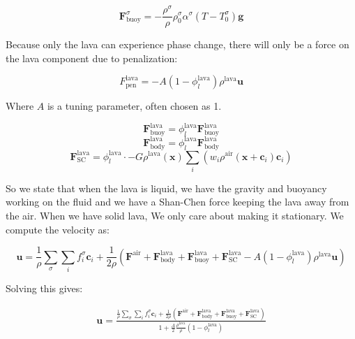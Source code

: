 \begin{equation}
    \bm{F}_{\text{buoy}}^\sigma = -\frac{\rho^\sigma}{\rho}\rho^\sigma_0\alpha^\sigma\left(T - T_0^\sigma\right)\bm{g}
\end{equation}

Because only the lava can experience phase change, there will only be a force on the lava component due to penalization:

\begin{equation}
    F_{\text{pen}}^{\text{lava}} = -A\left(1 - \phi_l^{\text{lava}}\right) \rho^{\text{lava}}\bm{u}
\end{equation}

Where $A$ is a tuning parameter, often chosen as 1. 

\begin{equation}
    \bm{F}_{\text{buoy}}^{\text{lava}} = \phi_l^{\text{lava}}\bm{F}^{\text{lava}}_{\text{buoy}}
\end{equation}
\begin{equation}
    \bm{F}_{\text{body}}^{\text{lava}} = \phi_l^{\text{lava}}\bm{F}^{\text{lava}}_{\text{body}}
\end{equation}
\begin{equation}
    \bm{F}_{\text{SC}}^{\text{lava}} = \phi_l^{\text{lava}} \cdot -G \rho^{\text{lava}}(\bm{x}) \sum_i \left(w_i \rho^{\text{air}}(\bm{x} + \bm{c}_i) \bm{c}_i \right) 
\end{equation}

So we state that when the lava is liquid, we have the gravity and buoyancy working on the fluid and we have a Shan-Chen force keeping the lava away from the air. When we have solid lava, We only care about making it stationary. We compute the velocity as:

\begin{equation}
    \bm{u} =  \frac{1}{\rho}\sum_{\sigma} \sum_i f_i^\sigma \bm{c}_i + \frac{1}{2\rho}\left(\bm{F}^{\text{air}} + \bm{F}^{\text{lava}}_{\text{body}} + \bm{F}^{\text{lava}}_{\text{buoy}} + \bm{F}^{\text{lava}}_{\text{SC}} -A\left(1 - \phi_l^{\text{lava}}\right) \rho^{\text{lava}}\bm{u}\right)
\end{equation}

Solving this gives:

\begin{equation}
\begin{split}
    \bm{u} = \frac{\frac{1}{\rho}\sum_{\sigma} \sum_i f_i^\sigma \bm{c}_i + \frac{1}{2\rho}\left(\bm{F}^{\text{air}} + \bm{F}^{\text{lava}}_{\text{body}} + \bm{F}^{\text{lava}}_{\text{buoy}} + \bm{F}^{\text{lava}}_{\text{SC}}\right)}{1 + \frac{A}{2}\frac{\rho^{\text{lava}}}{\rho}\left(1 - \phi_l^{\text{lava}}\right)}
\end{split}
\end{equation}



